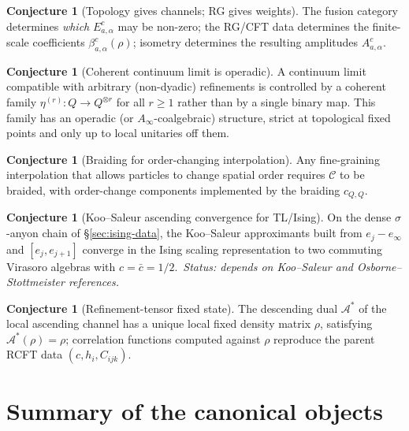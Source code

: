 \documentclass[11pt,a4paper]{article}
\theoremstyle{definition}
\newtheorem{conjecture}[definition]{Conjecture}
\newcommand{\Cc}{\mathcal{C}}
\newcommand{\Aa}{\mathcal{A}}
\begin{document}
\begin{conjecture}[Topology gives channels; RG gives weights]\label{conj:C}
The fusion category determines \emph{which} $E^{c}_{a,\alpha}$ may be
non-zero; the RG/CFT data determines the finite-scale coefficients
$\beta^{c}_{a,\alpha}(\rho)$; isometry determines the resulting amplitudes
$A^{c}_{a,\alpha}$.
\end{conjecture}

\begin{conjecture}[Coherent continuum limit is operadic]\label{conj:D}
A continuum limit compatible with arbitrary (non-dyadic) refinements is
controlled by a coherent family $\eta^{(r)}:Q\to Q^{\otimes r}$ for all
$r\ge 1$ rather than by a single binary map. This family has an operadic
(or $A_\infty$-coalgebraic) structure, strict at topological fixed points
and only up to local unitaries off them.
\end{conjecture}

\begin{conjecture}[Braiding for order-changing interpolation]\label{conj:E}
Any fine-graining interpolation that allows particles to change spatial order
requires $\Cc$ to be braided, with order-change components implemented by
the braiding $c_{Q,Q}$.
\end{conjecture}

\begin{conjecture}[Koo--Saleur ascending convergence for TL/Ising]
\label{conj:KS}
On the dense $\sigma$-anyon chain of \S\ref{sec:ising-data}, the Koo--Saleur
approximants built from $e_j - e_\infty$ and $[e_j, e_{j+1}]$ converge in
the Ising scaling representation to two commuting Virasoro algebras with
$c = \bar c = 1/2$.\cite{SRC-OAR-FERMIONS,SRC-OAR-WAVELETS,SRC-OSBORNE-CONTINUUM}\ \emph{Status: depends on
Koo--Saleur and Osborne--Stottmeister references.}
\end{conjecture}

\begin{conjecture}[Refinement-tensor fixed state]\label{conj:fixed-state}
The descending dual $\Aa^{*}$ of the local ascending channel has a unique
local fixed density matrix $\rho$, satisfying $\Aa^{*}(\rho)=\rho$;
correlation functions computed against $\rho$ reproduce the parent RCFT
data $(c, h_i, C_{ijk})$.
\end{conjecture}

\section{Summary of the canonical objects}
\end{document}
